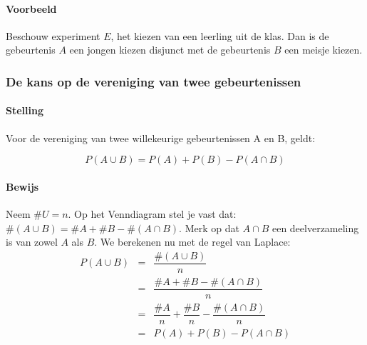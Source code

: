 \documentclass[12pt,twoside]{article}
\begin{document}
\paragraph*{Voorbeeld}
Beschouw experiment $E$, het kiezen van een leerling uit de klas. Dan is de gebeurtenis $A$ een jongen kiezen disjunct met de gebeurtenis $B$ een meisje kiezen.

\subsubsection{De kans op de vereniging van twee gebeurtenissen}

\paragraph*{Stelling }Voor de vereniging van twee willekeurige gebeurtenissen A en B, geldt:\\
\begin{mdframed}
$$P(A \cup B) = P(A) + P(B) - P(A \cap B)$$
\end{mdframed}

\paragraph*{Bewijs}
\begin{center}
\end{center}
Neem $\#U = n$. Op het Venndiagram stel je vast dat: $\#(A\cup B)=\#A + \#B - \#(A\cap B)$. Merk op dat $A \cap B$ een deelverzameling is van zowel $A$ als $B$. We berekenen nu met de regel van Laplace:
\begin{eqnarray*}
  P(A \cup B) &=& \dfrac{\#(A \cup B)}{n}\\
              &=& \dfrac{\#A + \#B - \#(A\cap B)}{n}\\
              &=& \dfrac{\#A}{n} + \dfrac{\#B}{n} - \dfrac{\#(A\cap B)}{n}\\
              &=& P(A) + P(B) - P(A\cap B)
\end{eqnarray*}
\end{document}
